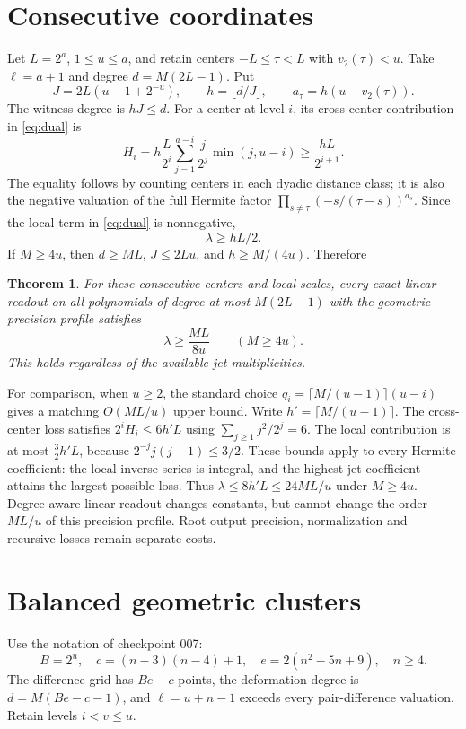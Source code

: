 \documentclass[11pt]{article}
\newtheorem{theorem}{Theorem}
\begin{document}
\section{Consecutive coordinates}
Let $L=2^a$, $1\le u\le a$, and retain centers
$-L\le\tau<L$ with $v_2(\tau)<u$. Take $\ell=a+1$ and degree
$d=M(2L-1)$. Put
\[
 J=2L(u-1+2^{-u}),\qquad h=\lfloor d/J\rfloor,\qquad
 a_\tau=h(u-v_2(\tau)).
\]
The witness degree is $hJ\le d$. For a center at level $i$, its
cross-center contribution in \eqref{eq:dual} is
\[
 H_i=h\frac{L}{2^i}
       \sum_{j=1}^{a-i}\frac{j}{2^j}\min(j,u-i)
 \ge\frac{hL}{2^{i+1}}.
\]
The equality follows by counting centers in each dyadic distance
class; it is also the negative valuation of the full Hermite factor
$\prod_{s\ne\tau}(-s/(\tau-s))^{a_s}$.
Since the local term in \eqref{eq:dual} is nonnegative,
\[
 \lambda\ge hL/2.
\]
If $M\ge4u$, then $d\ge ML$, $J\le2Lu$, and
$h\ge M/(4u)$. Therefore
\begin{theorem}
For these consecutive centers and local scales, every exact linear
readout on all polynomials of degree at most $M(2L-1)$ with the
geometric precision profile satisfies
\[
 \lambda\ge\frac{ML}{8u}\qquad(M\ge4u).
\]
This holds regardless of the available jet multiplicities.
\end{theorem}

For comparison, when $u\ge2$, the standard choice
$q_i=\lceil M/(u-1)\rceil(u-i)$ gives a matching $O(ML/u)$ upper bound.
Write $h'=\lceil M/(u-1)\rceil$. The cross-center loss satisfies
$2^iH_i\le6h'L$ using $\sum_{j\ge1}j^2/2^j=6$.
The local contribution is at most $\tfrac32h'L$, because
$2^{-j}j(j+1)\le3/2$. These bounds apply to every Hermite coefficient:
the local inverse series is integral, and the highest-jet coefficient
attains the largest possible loss. Thus $\lambda\le8h'L\le24ML/u$
under $M\ge4u$. Degree-aware linear readout changes constants, but
cannot change the order $ML/u$ of this precision profile. Root output
precision, normalization and recursive losses remain separate costs.

\section{Balanced geometric clusters}
Use the notation of checkpoint 007:
\[
 B=2^u,\quad c=(n-3)(n-4)+1,\quad e=2(n^2-5n+9),\quad n\ge4.
\]
The difference grid has $Be-c$ points, the deformation degree is
$d=M(Be-c-1)$, and $\ell=u+n-1$ exceeds every pair-difference
valuation. Retain levels $i<v\le u$.
\end{document}
